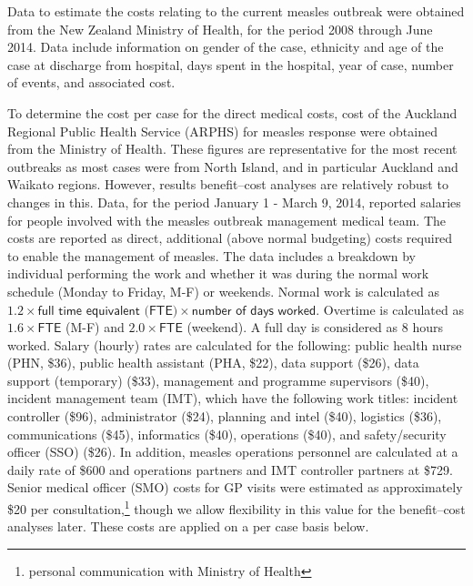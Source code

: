 \documentclass{article}
\begin{document}
Data to estimate the costs relating to the current measles outbreak were obtained from the New Zealand Ministry of Health, for the period 2008 through June 2014. Data include information on gender of the case, ethnicity and age of the case at discharge from hospital, days spent in the hospital, year of case, number of events, and associated cost.

To determine the cost per case for the direct medical costs, cost of the Auckland Regional Public Health Service (ARPHS) for measles response were obtained from the Ministry of Health. These figures are representative for the most recent outbreaks as most cases were from North Island, and in particular Auckland and Waikato regions. However, results benefit--cost analyses are relatively robust to changes in this. Data, for the period January 1 - March 9, 2014, reported salaries for people involved with the measles outbreak management medical team. The costs are reported as direct, additional (above normal budgeting) costs required to enable the management of measles. The data includes a breakdown by individual performing the work and whether it was during the normal work schedule (Monday to Friday, M-F) or weekends. Normal work is calculated as $1.2 \times \textsf{full time equivalent (FTE)} \times \textsf{number of days worked}$. Overtime is calculated as $1.6\times\textsf{FTE}$ (M-F) and $2.0 \times \textsf{FTE}$ (weekend). A full day is considered as 8 hours worked. Salary (hourly) rates are calculated for the following: public health nurse (PHN, \$36), public health assistant (PHA, \$22), data support (\$26), data support (temporary) (\$33), management and programme supervisors (\$40), incident management team (IMT), which have the following work titles: incident controller (\$96), administrator (\$24), planning and intel (\$40), logistics (\$36), communications (\$45), informatics (\$40), operations (\$40), and safety/security officer (SSO) (\$26). In addition, measles operations personnel are calculated at a daily rate of \$600 and operations partners and IMT controller partners at \$729. Senior medical officer (SMO) costs for GP visits were estimated as approximately \$20 per consultation,\footnote{personal communication with Ministry of Health} though we allow flexibility in this value for the benefit--cost analyses later. These costs are applied on a per case basis below.
\end{document}
